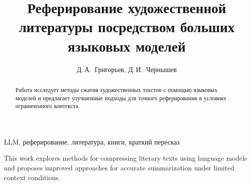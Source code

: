 \documentclass{article}
\theoremstyle{definition}
\theoremstyle{plain}
\begin{document}


\title{Реферирование художественной литературы посредством больших языковых моделей}

\author{Д.\,А.~Григорьев\Addressmark[1]\Emailmark[1], Д.\,И.~Чернышев\Addressmark[1]\Emailmark[2]}











\maketitle

\begin{abstract}
Работа исследует методы сжатия художественных текстов с помощью языковых моделей и предлагает улучшенные подходы для точного реферирования в условиях ограниченного контекста.
\end{abstract}

\begin{keywords}
LLM, реферирование, литература, книги, краткий пересказ
\end{keywords}

\begin{altabstract}
This work explores methods for compressing literary texts using language models and proposes improved approaches for accurate summarization under limited context conditions.
\end{altabstract}
\end{document}
